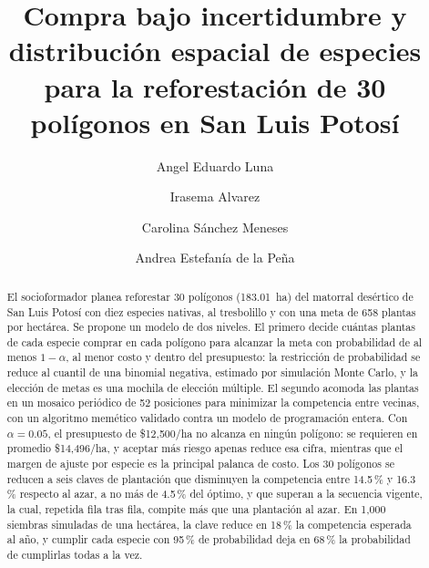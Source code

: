 \documentclass[a4paper,fleqn]{cas-dc}
\theoremstyle{definition}
\begin{document}
\let\WriteBookmarks\relax
\def\floatpagepagefraction{1}
\def\textpagefraction{.001}


\title[mode=title]{Compra bajo incertidumbre y distribución espacial de especies
  para la reforestación de 30 polígonos en San Luis Potosí}

\author[tec]{Angel Eduardo Luna}
\author[tec]{Irasema Alvarez}
\author[tec]{Carolina Sánchez Meneses}
\author[tec]{Andrea Estefanía de la Peña}



\begin{abstract}
El socioformador planea reforestar 30 polígonos (183.01~ha) del
matorral desértico de San Luis Potosí con diez especies nativas, al tresbolillo
y con una meta de 658 plantas por hectárea. Se propone un modelo de dos
niveles. El primero decide cuántas plantas de cada especie comprar en cada
polígono para alcanzar la meta con probabilidad de al menos $1-\alpha$, al
menor costo y dentro del presupuesto: la restricción de probabilidad se reduce
al cuantil de una binomial negativa, estimado por simulación Monte Carlo, y la
elección de metas es una mochila de elección múltiple. El segundo acomoda las
plantas en un mosaico periódico de 52 posiciones para minimizar la competencia
entre vecinas, con un algoritmo memético validado contra un modelo de
programación entera. Con $\alpha=0.05$, el presupuesto de \$12{,}500/ha no
alcanza en ningún polígono: se requieren en promedio \$14{,}496/ha, y aceptar
más riesgo apenas reduce esa cifra, mientras que el margen de ajuste por
especie es la principal palanca de costo. Los 30 polígonos se reducen a seis
claves de plantación que disminuyen la competencia entre 14.5\,\% y 16.3\,\%
respecto al azar, a no más de 4.5\,\% del óptimo, y que superan a la secuencia
vigente, la cual, repetida fila tras fila, compite más que una plantación al
azar. En 1{,}000 siembras simuladas de una hectárea, la clave reduce en 18\,\%
la competencia esperada al año, y cumplir cada especie con 95\,\% de
probabilidad deja en 68\,\% la probabilidad de cumplirlas todas a la vez.
\end{abstract}
\end{document}
